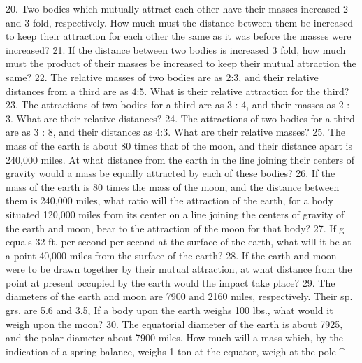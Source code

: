 20. Two bodies which mutually attract each other have their masses increased 2 and 3 fold, respectively. How much must the distance between them be increased to keep their attraction for each other the same as it was before the masses were increased?
21. If the distance between two bodies is increased 3 fold, how much must the product of their masses be increased to keep their mutual attraction the same?
22. The relative masses of two bodies are as 2:3, and their relative distances from a third are as 4:5. What is their relative attraction for the third?
23. The attractions of two bodies for a third are as 3 : 4, and their masses as 2 : 3. What are their relative distances?
24. The attractions of two bodies for a third are as 3 : 8, and their distances as 4:3. What are their relative masses?
25. The mass of the earth is about 80 times that of the moon, and their distance apart is 240,000 miles. At what distance from the earth in the line joining their centers of gravity would a mass be equally attracted by each of these bodies?
26. If the mass of the earth is 80 times the mass of the moon, and the distance between them is 240,000 miles, what ratio will the attraction of the earth, for a body situated 120,000 miles from its center on a line joining the centers of gravity of the earth and moon, bear to the attraction of the moon for that body?
27. If g equals 32 ft. per second per second at the surface of the earth, what will it be at a point 40,000 miles from the surface of the earth?
28. If the earth and moon were to be drawn together by their mutual attraction, at what distance from the point at present occupied by the earth would the impact take place?
29. The diameters of the earth and moon are 7900 and 2160 miles, respectively. Their sp. grs. are 5.6 and 3.5, If a body upon the earth weighs 100 lbs., what would it weigh upon the moon?
30. The equatorial diameter of the earth is about 7925, and the polar diameter about 7900 miles. How much will a mass which, by the indication of a spring balance, weighs 1 ton at the equator, weigh at the pole ^
